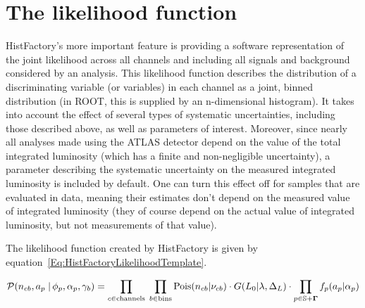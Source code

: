 \section{The likelihood function}

HistFactory's more important feature is providing a software representation of the joint likelihood across all channels and including all signals and background considered by an analysis.
This likelihood function describes the distribution of a discriminating variable (or variables) in each channel as a joint, binned distribution (in ROOT, this is supplied by an n-dimensional histogram).
It takes into account the effect of several types of systematic uncertainties, including those described above, as well as parameters of interest.
Moreover, since nearly all analyses made using the ATLAS detector depend on the value of the total integrated luminosity (which has a finite and non-negligible uncertainty),
a parameter describing the systematic uncertainty on the measured integrated luminosity is included by default.
One can turn this effect off for samples that are evaluated in data, meaning their estimates don't depend on the measured value of integrated luminosity (they of course depend on the actual value of integrated luminosity, but not measurements of that value).

The likelihood function created by HistFactory is given by equation~\ref{Eq:HistFactoryLikelihoodTemplate}.

\begin{eqnarray}
\label{Eq:HistFactoryLikelihoodTemplate}
\nonumber
{\cal P}( n_{cb}, a_p \; |\,\phi_p,\alpha_p,\gamma_b)=   \prod_{c\in \textrm{channels}} \; \prod_{b\in \textrm{bins}} \textrm{Pois}(n_{cb}|\nu_{cb}) \cdot G(L_0 | \lambda, \Delta_L) \cdot \prod_{p\in \mathbb{S}+\mathbf{\Gamma}} f_p(a_p|\alpha_p)
\end{eqnarray}

